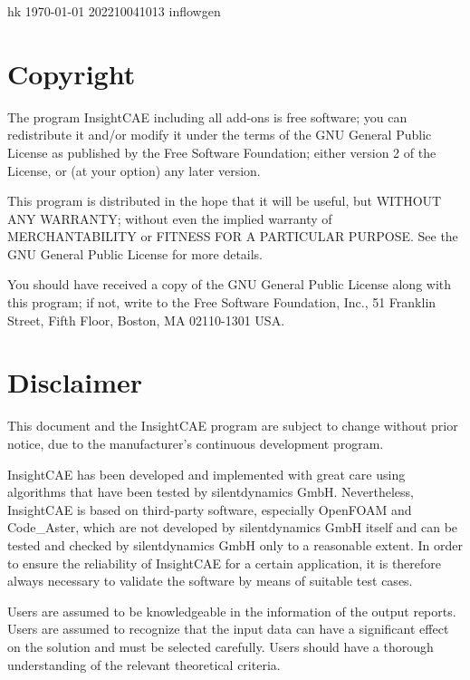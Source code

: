 \documentclass{sd_report}
\begin{document}
{hk} %
{\today} %
{202210041013} %
{inflowgen}

\newcommand{\is}{InsightCAE\xspace}
\newcommand{\sd}{silentdynamics GmbH\xspace}

\section{Copyright}
The program InsightCAE including all add-ons is free software; you can redistribute it and/or modify
  it under the terms of the GNU General Public License as published by
  the Free Software Foundation; either version 2 of the License, or
  (at your option) any later version.
 
  This program is distributed in the hope that it will be useful,
  but WITHOUT ANY WARRANTY; without even the implied warranty of
  MERCHANTABILITY or FITNESS FOR A PARTICULAR PURPOSE.  See the
  GNU General Public License for more details.
 
  You should have received a copy of the GNU General Public License along
  with this program; if not, write to the Free Software Foundation, Inc.,
  51 Franklin Street, Fifth Floor, Boston, MA 02110-1301 USA.

\section{Disclaimer}
This document and the InsightCAE program are subject to change without prior notice, due to the manufacturer’s continuous development program.

InsightCAE has been developed and implemented with great care using algorithms that have been tested by \sd. Nevertheless, InsightCAE is based on third-party software, especially OpenFOAM and Code\_Aster, which are not developed by \sd itself and can be tested and checked by \sd only to a reasonable extent.  In order to ensure the reliability of InsightCAE for a certain application, it is therefore always necessary to validate the software by means of suitable test cases.

Users are assumed to be
knowledgeable in the information of the output reports. Users are assumed to
recognize that the input data can have a significant effect on the solution and must be
selected carefully. Users should have a thorough understanding of the relevant
theoretical criteria.
\end{document}
